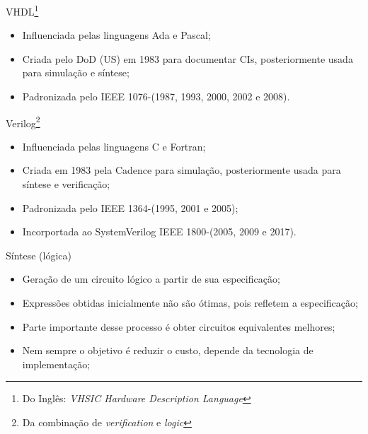 \begin{frame}{VHDL\footnote{Do Inglês: \textit{VHSIC\footnotemark{} Hardware Description Language}}}
    \begin{itemize}
        \item Influenciada pelas linguagens Ada e Pascal; 
        \item Criada pelo DoD (US) em 1983 para documentar CIs, posteriormente usada para simulação e síntese; 
        \item Padronizada pelo IEEE 1076-(1987, 1993, 2000, 2002 e 2008). 
    \end{itemize}
\end{frame}

\begin{frame}{Verilog\footnote{Da combinação de \textit{verification} e \textit{logic}}}
    \begin{itemize}
        \item Influenciada pelas linguagens C e Fortran; 
        \item Criada em 1983 pela Cadence para simulação, posteriormente usada para síntese e verificação; 
        \item Padronizada pelo IEEE 1364-(1995, 2001 e 2005);
        \item Incorportada ao SystemVerilog IEEE 1800-(2005, 2009 e 2017).
    \end{itemize}
\end{frame}

\begin{frame}{Síntese (lógica)}
    \begin{itemize}
        \item Geração de um circuito lógico a partir de sua especificação; 
        \item Expressões obtidas inicialmente não são ótimas, pois refletem a especificação; 
        \item Parte importante desse processo é obter circuitos equivalentes melhores; 
        \item Nem sempre o objetivo é reduzir o custo, depende da tecnologia de implementação; 
    \end{itemize}
\end{frame}


